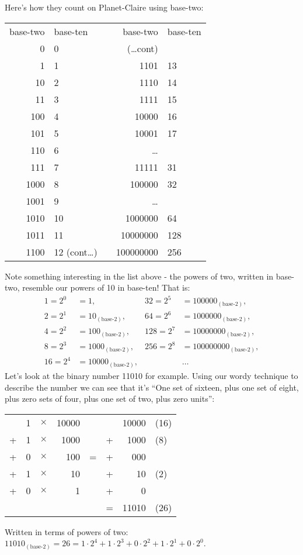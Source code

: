 \documentclass{article}
\begin{document}
Here's how they count on Planet-Claire using base-two:
\begin{center}
\begin{tabular}{r l c r l}
base-two & base-ten & \; \; \; \; & base-two & base-ten\\
0 & 0 & \phantom& (\dots cont)\\
1 & 1 & \phantom& 1101 & 13\\
10 & 2 & \phantom& 1110 & 14\\
11 & 3 & \phantom& 1111 & 15\\
100 & 4 & \phantom& 10000 & 16\\
101 & 5 & \phantom& 10001 & 17\\
110 & 6 & \phantom& \dots{}\\
111 & 7 & \phantom& 11111 & 31\\
1000 & 8 & \phantom& 100000 & 32\\
1001 & 9 & \phantom& \dots{}\\
1010 & 10 & \phantom & 1000000 & 64\\
1011 & 11 & \phantom& 10000000 & 128\\
1100 & 12 (cont\dots) & \phantom& 100000000 & 256
\end{tabular}
\end{center}

Note something interesting in the list above - the powers of two,
written in base-two,
resemble our powers of 10 in base-ten! That is:
\begin{align*}
1 = 2^0&= 1, & 32 = 2^5&= 100000_{(\text{base-2})},\\
2 = 2^1&= 10_{(\text{base-2})}, & 64 = 2^6&= 1000000_{(\text{base-2})},\\
4 = 2^2&= 100_{(\text{base-2})}, & 128 = 2^7&= 10000000_{(\text{base-2})},\\
8 = 2^3&= 1000_{(\text{base-2})},& 256 = 2^8&= 100000000_{(\text{base-2})},\\
16 = 2^4&= 10000_{(\text{base-2})},& & \dots{}
\end{align*}
Let's look at the binary number 11010 for example.
Using our wordy technique to describe the number
we can see that it's ``One set of sixteen,
plus one set of eight, plus zero sets of four,
plus one set of two, plus zero units'': 
\begin{center}
\begin{tabular}{r r r r c r r l}
\phantom & 1 & $\times$ & 10000 & \phantom & \phantom & 10000 & (16)\\
+ & 1 & $\times$ & 1000 & \phantom & + & 1000 & (8)\\
+ & 0 & $\times$ & 100 & \; \; = \; \; & + & 000 & \\
+ & 1 & $\times$ & 10 & \phantom & + & 10 & (2)\\
+ & 0 & $\times$ & 1 & \phantom & + & 0\\
\cline{6-8}
\phantom & \phantom & \phantom & \phantom & \phantom & = & 11010 & (26)\\
\end{tabular}
\end{center}
Written in terms of powers of two:
$11010_{(\text{base-2})}=26=1\cdot2^4+1\cdot2^3+0\cdot2^2+1\cdot2^1+0\cdot2^0$.
\end{document}
